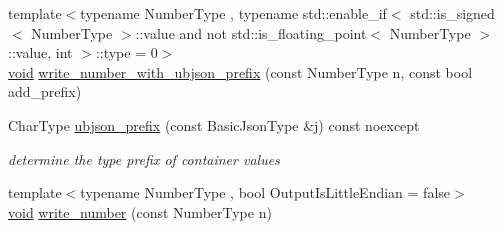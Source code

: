 \begin{DoxyCompactItemize}
\item 
{\footnotesize template$<$typename Number\+Type , typename std\+::enable\+\_\+if$<$ std\+::is\+\_\+signed$<$ Number\+Type $>$\+::value and not std\+::is\+\_\+floating\+\_\+point$<$ Number\+Type $>$\+::value, int $>$\+::type  = 0$>$ }\\\hyperlink{namespacenlohmann_1_1detail_a59fca69799f6b9e366710cb9043aa77d}{void} \hyperlink{classnlohmann_1_1detail_1_1binary__writer_a0ea6745f944c0c61672146886b4ee90f}{write\+\_\+number\+\_\+with\+\_\+ubjson\+\_\+prefix} (const Number\+Type n, const bool add\+\_\+prefix)
\item 
Char\+Type \hyperlink{classnlohmann_1_1detail_1_1binary__writer_a4c129249a5aee8e4ec8add6c6184e4f7}{ubjson\+\_\+prefix} (const Basic\+Json\+Type \&j) const noexcept
\begin{DoxyCompactList}\small\item\em determine the type prefix of container values \end{DoxyCompactList}\item 
{\footnotesize template$<$typename Number\+Type , bool Output\+Is\+Little\+Endian = false$>$ }\\\hyperlink{namespacenlohmann_1_1detail_a59fca69799f6b9e366710cb9043aa77d}{void} \hyperlink{classnlohmann_1_1detail_1_1binary__writer_a6e11b7227fcecc25a548ed45507b7d1c}{write\+\_\+number} (const Number\+Type n)
\end{DoxyCompactItemize}
